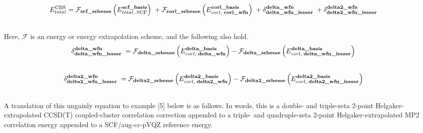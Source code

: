 \documentclass[letterpaper,10pt,english]{sphinxmanual}
\begin{document}
\begin{gather}
\begin{split}E_{total}^{\text{CBS}} = \mathcal{F}_{\textbf{scf\_scheme}} \left(E_{total,\; \text{SCF}}^{\textbf{scf\_basis}}\right) \; + \mathcal{F}_{\textbf{corl\_scheme}} \left(E_{corl,\; \textbf{corl\_wfn}}^{\textbf{corl\_basis}}\right) \; + \delta_{\textbf{delta\_wfn\_lesser}}^{\textbf{delta\_wfn}} \; + \delta_{\textbf{delta2\_wfn\_lesser}}^{\textbf{delta2\_wfn}}\end{split}\notag\\\begin{split}\end{split}\notag
\end{gather}
Here, $\mathcal{F}$ is an energy or energy extrapolation scheme, and the following also hold.
\begin{gather}
\begin{split}\delta_{\textbf{delta\_wfn\_lesser}}^{\textbf{delta\_wfn}} \; = \mathcal{F}_{\textbf{delta\_scheme}} \left(E_{corl,\; \textbf{delta\_wfn}}^{\textbf{delta\_basis}}\right) - \mathcal{F}_{\textbf{delta\_scheme}} \left(E_{corl,\; \textbf{delta\_wfn\_lesser}}^{\textbf{delta\_basis}}\right)\end{split}\notag\\\begin{split}\end{split}\notag
\end{gather}\begin{gather}
\begin{split}\delta_{\textbf{delta2\_wfn\_lesser}}^{\textbf{delta2\_wfn}} \; = \mathcal{F}_{\textbf{delta2\_scheme}} \left(E_{corl,\; \textbf{delta2\_wfn}}^{\textbf{delta2\_basis}}\right) - \mathcal{F}_{\textbf{delta2\_scheme}} \left(E_{corl,\; \textbf{delta2\_wfn\_lesser}}^{\textbf{delta2\_basis}}\right)\end{split}\notag\\\begin{split}\end{split}\notag
\end{gather}
A translation of this ungainly equation to example {[}5{]} below is as
follows. In words, this is a double- and triple-zeta 2-point
Helgaker-extrapolated CCSD(T) coupled-cluster correlation correction
appended to a triple- and quadruple-zeta 2-point
Helgaker-extrapolated MP2 correlation energy appended to a SCF/aug-cc-pVQZ
reference energy.
\end{document}

